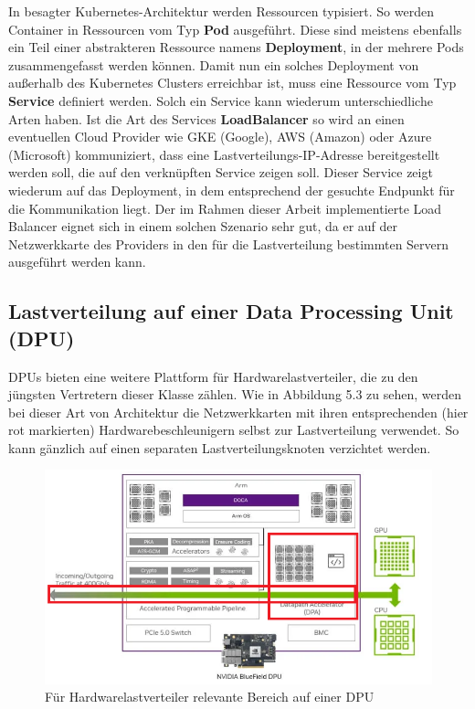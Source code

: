 In besagter Kubernetes-Architektur werden Ressourcen typisiert. So werden Container in Ressourcen vom Typ \textbf{Pod} ausgeführt. Diese sind meistens ebenfalls ein Teil einer abstrakteren Ressource namens \textbf{Deployment}, in der mehrere Pods zusammengefasst werden können. Damit nun ein solches Deployment von außerhalb des Kubernetes Clusters erreichbar ist, muss eine Ressource vom Typ \textbf{Service} definiert werden. Solch ein Service kann wiederum unterschiedliche Arten haben. Ist die Art des Services \textbf{LoadBalancer} so wird an einen eventuellen Cloud Provider wie GKE (Google), AWS (Amazon) oder Azure (Microsoft) kommuniziert, dass eine Lastverteilungs-IP-Adresse bereitgestellt werden soll, die auf den verknüpften Service zeigen soll. Dieser Service zeigt wiederum auf das Deployment, in dem entsprechend der gesuchte Endpunkt für die Kommunikation liegt. Der im Rahmen dieser Arbeit implementierte Load Balancer eignet sich in einem solchen Szenario sehr gut, da er auf der Netzwerkkarte des Providers in den für die Lastverteilung bestimmten Servern ausgeführt werden kann. 
\subsection{Lastverteilung auf einer Data Processing Unit (DPU)}
DPUs bieten eine weitere Plattform für Hardwarelastverteiler, die zu den jüngsten Vertretern dieser Klasse zählen. Wie in Abbildung 5.3 zu sehen, werden bei dieser Art von Architektur die Netzwerkkarten mit ihren entsprechenden (hier rot markierten) Hardwarebeschleunigern selbst zur Lastverteilung verwendet. So kann gänzlich auf einen separaten Lastverteilungsknoten verzichtet werden.
\begin{figure}
    \centering
    \includegraphics[width=0.9\linewidth]{images/nvda-bluefield-dpu-red.png}
    \caption{Für Hardwarelastverteiler relevante Bereich auf einer DPU \cite{fibermall_bluefield3}}
    \label{fig:enter-label}
\end{figure}